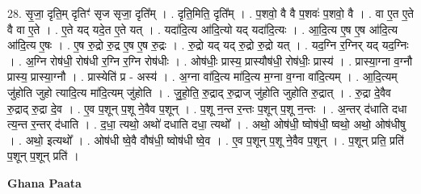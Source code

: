 \documentclass[17pt]{extarticle}
\begin{document}
28. सृ॒जा॒ दृति॒म् दृतिꣳ॑ सृज सृजा॒ दृति᳚म् । . दृति॒मिति॒ दृति᳚म् । . प॒शवो॒ वै वै प॒शवः॑ प॒शवो॒ वै । . वा ए॒त ए॒ते वै वा ए॒ते । . ए॒ते यद् यदे॒त ए॒ते यत् । . यदा॑दि॒त्य आ॑दि॒त्यो यद् यदा॑दि॒त्यः । . आ॒दि॒त्य ए॒ष ए॒ष आ॑दि॒त्य आ॑दि॒त्य ए॒षः । . ए॒ष रु॒द्रो रु॒द्र ए॒ष ए॒ष रु॒द्रः । . रु॒द्रो यद् यद् रु॒द्रो रु॒द्रो यत् । . यद॒ग्नि र॒ग्निर् यद् यद॒ग्निः । . अ॒ग्नि रोष॑धी॒ रोष॑धी र॒ग्नि र॒ग्नि रोष॑धीः । . ओष॑धीः॒ प्रास्य॒ प्रास्यौष॑धी॒ रोष॑धीः॒ प्रास्य॑ । . प्रास्या॒ग्ना व॒ग्नौ प्रास्य॒ प्रास्या॒ग्नौ । . प्रास्येति॑ प्र - अस्य॑ । . अ॒ग्ना वा॑दि॒त्य मा॑दि॒त्य म॒ग्ना व॒ग्ना वा॑दि॒त्यम् । . आ॒दि॒त्यम् जु॑होति जुहो त्यादि॒त्य मा॑दि॒त्यम् जु॑होति । . जु॒हो॒ति॒ रु॒द्राद् रु॒द्राज् जु॑होति जुहोति रु॒द्रात् । . रु॒द्रा दे॒वैव रु॒द्राद् रु॒द्रा दे॒व । . ए॒व प॒शून् प॒शू ने॒वैव प॒शून् । . प॒शू न॒न्त र॒न्तः प॒शून् प॒शू न॒न्तः । . अ॒न्तर् द॑धाति दधा त्य॒न्त र॒न्तर् द॑धाति । . द॒धा॒ त्यथो॒ अथो॑ दधाति दधा॒ त्यथो᳚ । . अथो॒ ओष॑धी॒ ष्वोष॑धी॒ ष्वथो॒ अथो॒ ओष॑धीषु । . अथो॒ इत्यथो᳚ । . ओष॑धी ष्वे॒वै वौष॑धी॒ ष्वोष॑धी ष्वे॒व । . ए॒व प॒शून् प॒शू ने॒वैव प॒शून् । . प॒शून् प्रति॒ प्रति॑ प॒शून् प॒शून् प्रति॑ । \newline

\textbf{Ghana Paata } \newline
\end{document}
